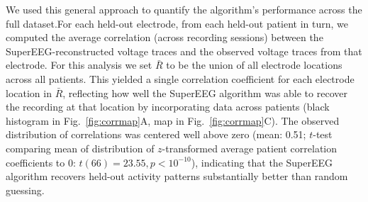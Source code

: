 \documentclass[11pt]{article}
\begin{document}
We used this general approach to
quantify the algorithm's performance across the full dataset.For each held-out electrode, from each held-out patient in turn, we
computed the average correlation (across recording sessions) between
the SuperEEG-reconstructed voltage traces and the observed voltage
traces from that electrode.  For this analysis we set $\bar{R}$ to be
the union of all electrode locations across all patients.  This
yielded a single correlation coefficient for each electrode location
in $\bar{R}$, reflecting how well the SuperEEG algorithm was able to
recover the recording at that location by incorporating data across
patients (black histogram in Fig.~\ref{fig:corrmap}A, map in
Fig.~\ref{fig:corrmap}C).  The observed distribution of correlations
was centered well above zero (mean: 0.51; $t$-test comparing mean of
distribution of $z$-transformed average patient correlation coefficients
to 0: $t(66) = 23.55, p < 10^{-10}$), indicating that the SuperEEG algorithm
recovers held-out activity patterns substantially better than random
guessing.
\end{document}

